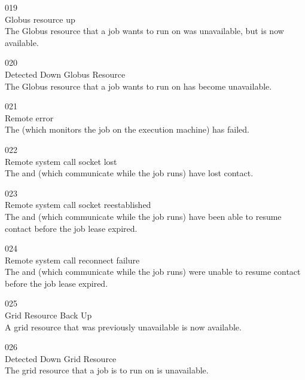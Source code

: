 \noindent{} 019 \\
 Globus resource up \\
 The Globus resource that a job wants to run
on was unavailable, but is now available.

\noindent{} 020 \\
 Detected Down Globus Resource \\
 The Globus resource that a job wants to run
on has become unavailable. 

\noindent{} 021 \\
 Remote error \\
 The  (which monitors the job
on the execution machine) has failed.

\noindent{} 022 \\
 Remote system call socket lost \\
 The  and 
(which communicate while the job runs) have lost contact.

\noindent{} 023 \\
 Remote system call socket reestablished \\
 The  and 
(which communicate while the job runs) have been able to resume
contact before the job lease expired.

\noindent{} 024 \\
 Remote system call reconnect failure \\
 The  and 
(which communicate while the job runs) were unable to resume
contact before the job lease expired.

\noindent{} 025 \\
 Grid Resource Back Up \\
 A grid resource that was previously
unavailable is now available.

\noindent{} 026 \\
 Detected Down Grid Resource \\
 The grid resource that a job is to
run on is unavailable.

